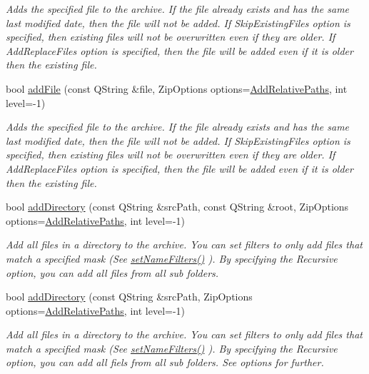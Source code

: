 \begin{DoxyCompactItemize}
\begin{DoxyCompactList}\small\item\em Adds the specified file to the archive. If the file already exists and has the same last modified date, then the file will not be added. If Skip\+Existing\+Files option is specified, then existing files will not be overwritten even if they are older. If Add\+Replace\+Files option is specified, then the file will be added even if it is older then the existing file. \end{DoxyCompactList}\item 
bool \hyperlink{class_ab_zip_aa71d315aae5caaab47e1a90b5fae6ceb}{add\+File} (const Q\+String \&file, Zip\+Options options=\hyperlink{class_ab_zip_a9c4f57d6b8d9a449c2eb6c4d4e53c9d5a9fe2234f7fddcfdae76f8aeb8c3c2d44}{Add\+Relative\+Paths}, int level=-\/1)
\begin{DoxyCompactList}\small\item\em Adds the specified file to the archive. If the file already exists and has the same last modified date, then the file will not be added. If Skip\+Existing\+Files option is specified, then existing files will not be overwritten even if they are older. If Add\+Replace\+Files option is specified, then the file will be added even if it is older then the existing file. \end{DoxyCompactList}\item 
bool \hyperlink{class_ab_zip_adf2414a410a25ef82ac7349b0a2d1c97}{add\+Directory} (const Q\+String \&src\+Path, const Q\+String \&root, Zip\+Options options=\hyperlink{class_ab_zip_a9c4f57d6b8d9a449c2eb6c4d4e53c9d5a9fe2234f7fddcfdae76f8aeb8c3c2d44}{Add\+Relative\+Paths}, int level=-\/1)
\begin{DoxyCompactList}\small\item\em Add all files in a directory to the archive. You can set filters to only add files that match a specified mask (See \hyperlink{class_ab_zip_a80724c61b6812aaea06f575860bed8e6}{set\+Name\+Filters()} ). By specifying the Recursive option, you can add all files from all sub folders. \end{DoxyCompactList}\item 
bool \hyperlink{class_ab_zip_a3345e5c1542f71379ca7086267f090fd}{add\+Directory} (const Q\+String \&src\+Path, Zip\+Options options=\hyperlink{class_ab_zip_a9c4f57d6b8d9a449c2eb6c4d4e53c9d5a9fe2234f7fddcfdae76f8aeb8c3c2d44}{Add\+Relative\+Paths}, int level=-\/1)
\begin{DoxyCompactList}\small\item\em Add all files in a directory to the archive. You can set filters to only add files that match a specified mask (See \hyperlink{class_ab_zip_a80724c61b6812aaea06f575860bed8e6}{set\+Name\+Filters()} ). By specifying the Recursive option, you can add all fiels from all sub folders. See options for further. \end{DoxyCompactList}\item 

\end{DoxyCompactItemize}
